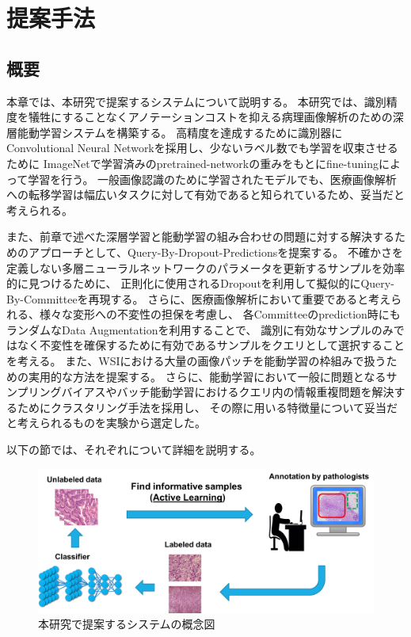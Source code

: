 \chapter{提案手法}

\section{概要}
本章では、本研究で提案するシステムについて説明する。
本研究では、識別精度を犠牲にすることなくアノテーションコストを抑える病理画像解析のための深層能動学習システムを構築する。
高精度を達成するために識別器にConvolutional Neural Networkを採用し、少ないラベル数でも学習を収束させるために
ImageNetで学習済みのpretrained-networkの重みをもとにfine-tuningによって学習を行う。
一般画像認識のために学習されたモデルでも、医療画像解析への転移学習は幅広いタスクに対して有効であると知られているため、妥当だと考えられる。

また、前章で述べた深層学習と能動学習の組み合わせの問題に対する解決するためのアプローチとして、Query-By-Dropout-Predictionsを提案する。
不確かさを定義しない多層ニューラルネットワークのパラメータを更新するサンプルを効率的に見つけるために、
正則化に使用されるDropoutを利用して擬似的にQuery-By-Committeeを再現する。
さらに、医療画像解析において重要であると考えられる、様々な変形への不変性の担保を考慮し、
各Committeeのprediction時にもランダムなData Augmentationを利用することで、
識別に有効なサンプルのみではなく不変性を確保するために有効であるサンプルをクエリとして選択することを考える。
また、WSIにおける大量の画像パッチを能動学習の枠組みで扱うための実用的な方法を提案する。
さらに、能動学習において一般に問題となるサンプリングバイアスやバッチ能動学習におけるクエリ内の情報重複問題を解決するためにクラスタリング手法を採用し、
その際に用いる特徴量について妥当だと考えられるものを実験から選定した。

以下の節では、それぞれについて詳細を説明する。

\clearpage

\begin{figure}[tbp]
    \label{fig:overview}
     \begin{center}
      \includegraphics[width=120mm]{figures/overview.png}
     \end{center}
    \caption{本研究で提案するシステムの概念図}
\end{figure}

